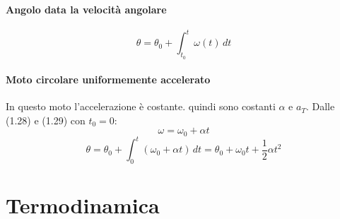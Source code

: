 \documentclass{report}
\begin{document}
\subsection{Angolo data la velocità angolare}
\begin{equation}
    \theta = \theta_0 + \int_{t_0}^{t}\omega(t)\,dt
\end{equation}

\subsection{Moto circolare uniformemente accelerato}
In questo moto l'accelerazione è costante. quindi sono costanti \(\alpha\)
e \(a_T\). Dalle (1.28) e (1.29) con \(t_0 = 0\):
\begin{equation*}
    \omega = \omega_0 + \alpha t
\end{equation*}
\begin{equation*}
    \theta = \theta_0 + \int_{0}^{t}(\omega_0 + \alpha t)\,dt
    = \theta_0 + \omega_0 t + \frac{1}{2}\alpha t^2
\end{equation*}



\part{Termodinamica}
\end{document}
